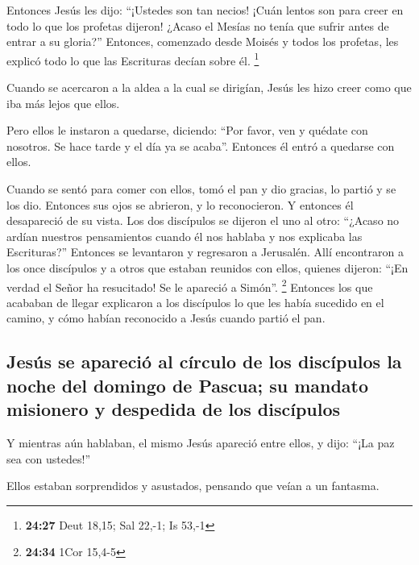  Entonces Jesús les dijo: ``¡Ustedes son tan necios!
¡Cuán lentos son para creer en todo lo que los profetas dijeron!
 ¿Acaso el Mesías no tenía que sufrir antes de entrar a
su gloria?''  Entonces, comenzado desde Moisés y todos
los profetas, les explicó todo lo que las Escrituras decían sobre él.
\footnote{\textbf{24:27} Deut 18,15; Sal 22,-1; Is 53,-1}

 Cuando se acercaron a la aldea a la cual se dirigían,
Jesús les hizo creer como que iba más lejos que ellos.

 Pero ellos le instaron a quedarse, diciendo: ``Por
favor, ven y quédate con nosotros. Se hace tarde y el día ya se acaba''.
Entonces él entró a quedarse con ellos.

 Cuando se sentó para comer con ellos, tomó el pan y dio
gracias, lo partió y se los dio.  Entonces sus ojos se
abrieron, y lo reconocieron. Y entonces él desapareció de su vista.
 Los dos discípulos se dijeron el uno al otro: ``¿Acaso
no ardían nuestros pensamientos cuando él nos hablaba y nos explicaba
las Escrituras?''  Entonces se levantaron y regresaron a
Jerusalén. Allí encontraron a los once discípulos y a otros que estaban
reunidos con ellos,  quienes dijeron: ``¡En verdad el
Señor ha resucitado! Se le apareció a Simón''. \footnote{\textbf{24:34}
  1Cor 15,4-5}  Entonces los que acababan de llegar
explicaron a los discípulos lo que les había sucedido en el camino, y
cómo habían reconocido a Jesús cuando partió el pan.

\hypertarget{jesuxfas-se-apareciuxf3-al-cuxedrculo-de-los-discuxedpulos-la-noche-del-domingo-de-pascua-su-mandato-misionero-y-despedida-de-los-discuxedpulos}{%
\subsection{Jesús se apareció al círculo de los discípulos la noche del
domingo de Pascua; su mandato misionero y despedida de los
discípulos}\label{jesuxfas-se-apareciuxf3-al-cuxedrculo-de-los-discuxedpulos-la-noche-del-domingo-de-pascua-su-mandato-misionero-y-despedida-de-los-discuxedpulos}}

 Y mientras aún hablaban, el mismo Jesús apareció entre
ellos, y dijo: ``¡La paz sea con ustedes!''

 Ellos estaban sorprendidos y asustados, pensando que
veían a un fantasma.

